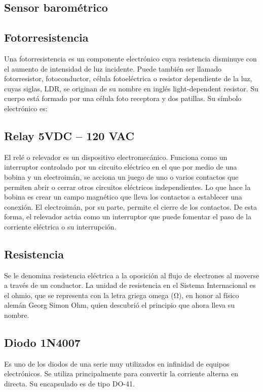 \documentclass{article}
\begin{document}
\subsection{Sensor barométrico}


\subsection{Fotorresistencia}

Una fotorresistencia es un componente electrónico cuya resistencia disminuye con el aumento de intensidad de luz incidente. Puede también ser llamado fotorresistor, fotoconductor, célula fotoeléctrica o resistor dependiente de la luz, cuyas siglas, LDR, se originan de su nombre en inglés light-dependent resistor. Su cuerpo está formado por una célula foto receptora y dos patillas. Su símbolo electrónico es:

\subsection{Relay 5VDC – 120 VAC}

El relé o relevador es un dispositivo electromecánico. Funciona como un interruptor controlado por un circuito eléctrico en el que por medio de una bobina y un electroimán, se acciona un juego de uno o varios contactos que permiten abrir o cerrar otros circuitos eléctricos independientes. Lo que hace la bobina es crear un campo magnético que lleva los contactos a establecer una conexión. El electroimán, por su parte, permite el cierre de los contactos. De esta forma, el relevador actúa como un interruptor que puede fomentar el paso de la corriente eléctrica o su interrupción. 

\subsection{Resistencia}

Se le denomina resistencia eléctrica a la oposición al flujo de electrones al moverse a través de un conductor. La unidad de resistencia en el Sistema Internacional es el ohmio, que se representa con la letra griega omega (Ω), en honor al físico alemán Georg Simon Ohm, quien descubrió el principio que ahora lleva su nombre.

\subsection{Diodo 1N4007}

Es uno de los diodos de una serie muy utilizados en infinidad de equipos electrónicos. Se utiliza principalmente para convertir la corriente alterna en directa. Su encapsulado es de tipo DO-41. 
\end{document}
